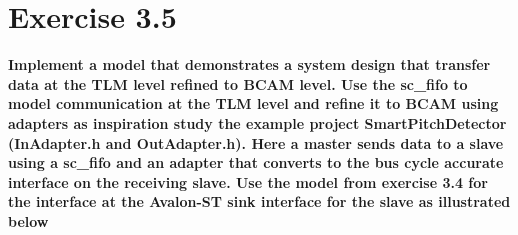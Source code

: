 
\chapter{Exercise 3.5}
\textbf{Implement a model that demonstrates a system design that transfer data at the TLM level
refined to BCAM level. Use the sc\_fifo to model communication at the TLM level and refine it to
BCAM using adapters as inspiration study the example project SmartPitchDetector (InAdapter.h
and OutAdapter.h). Here a master sends data to a slave using a sc\_fifo and an adapter that
converts to the bus cycle accurate interface on the receiving slave. Use the model from exercise
3.4 for the interface at the Avalon-ST sink interface for the slave as illustrated below}